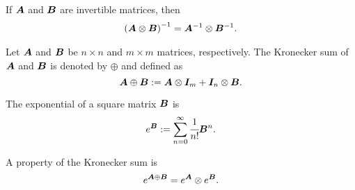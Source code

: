 If \(\boldsymbol A\) and \(\boldsymbol{B}\) are invertible matrices, then 
\begin{align}\label{eqn:kron inverse}
	\left(\boldsymbol A\otimes \boldsymbol{B}\right)^{-1} = \boldsymbol A^{-1}\otimes \boldsymbol{B}^{-1}.
\end{align}

Let \(\boldsymbol A\) and \(\boldsymbol{B}\) be \(n\times n\) and \(m\times m\) matrices, respectively. The Kronecker sum of \(\boldsymbol A\) and \(\boldsymbol{B}\) is denoted by \(\oplus\) and defined as 
\[\boldsymbol A\oplus \boldsymbol{B} := \boldsymbol A\otimes \boldsymbol{I}_{m} + \boldsymbol{I}_{n}\otimes \boldsymbol{B}.\]

The exponential of a square matrix \(\boldsymbol B\) is \[e^{\boldsymbol B} := \sum_{n=0}^\infty \cfrac{1}{n!}\boldsymbol B^n.\]

A property of the Kronecker sum is 
\begin{align}\label{eqn:kron exp}
	e^{\boldsymbol A\oplus \boldsymbol{B}}= e^{\boldsymbol A}\otimes e^{\boldsymbol{B}}.
\end{align}
	

